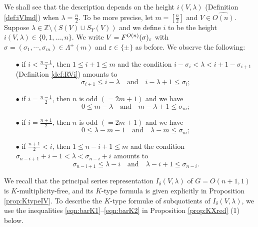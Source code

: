 We shall see that the description 
 depends on the height $i(V,\lambda)$ 
 (Definition \ref{def:iVlmd})
 when $\lambda = \frac n 2$.  
To be more precise,
 let $m=[\frac n 2]$ and $V \in \widehat{O(n)}$.  
Suppose $\lambda \in {\mathbb{Z}} \setminus(S(V) \cup S_Y(V))$
 and we define $i$ to be the height
 $i(V,\lambda) \in \{0,1,\ldots,n\}$.  
We write $V=F^{{O(n)}}({\sigma})_{\varepsilon}$
 with $\sigma=(\sigma_1, \cdots, \sigma_m)\in \Lambda^+(m)$
 and $\varepsilon \in \{\pm\}$ as before.  
We observe the following:
\begin{enumerate}
\item[$\bullet$]
if $i< \frac{n-1}{2}$, 
 then $1 \le i+1 \le m$
 and the condition $i-\sigma_i < \lambda< i+1 -\sigma_{i+1}$
 (Definition \ref{def:RVi})
 amounts to 
\begin{equation}
\label{eqn:barK1}
 \sigma_{i+1} \le i-\lambda
\quad\text{and}\quad 
 i-\lambda+1 \le \sigma_i;
\end{equation}
\item[$\bullet$]
if $i=\frac{n-1}{2}$, 
 then $n$ is odd $(=2m+1)$ 
 and we have
\begin{equation}
\label{eqn:barK3}
0 \le m-\lambda
\quad\text{and}\quad
m-\lambda+1 \le \sigma_m;
\end{equation}

\item[$\bullet$]
if $i=\frac{n+1}{2}$, 
 then $n$ is odd $(=2m+1)$ 
 and we have
\begin{equation}
\label{eqn:barK4}
0 \le \lambda-m-1
\quad\text{and}\quad
\lambda-m \le \sigma_m; 
\end{equation}
\item[$\bullet$]
if $\frac{n+1}2 < i$, 
 then $ 1 \le n-i+1 \le m$
 and the condition $\sigma_{n-i+1}+ i-1 < \lambda< \sigma_{n-i} +i$
 amounts to  
\begin{equation}
\label{eqn:barK2}
\sigma_{n-i+1} \le \lambda-i
\quad\text{and}\quad 
\lambda-i+1 \le \sigma_{n-i}.  
\end{equation}
\end{enumerate}

We recall that the principal series representation
$I_{\delta}(V,\lambda)$
 of $G=O(n+1,1)$
 is $K$-multiplicity-free,
 and its $K$-type formula 
 is given explicitly in Proposition \ref{prop:KtypeIV}.  
To describe the $K$-type formul{\ae}
 of subquotients of $I_{\delta}(V,\lambda)$, 
 we use the inequalities
 \eqref{eqn:barK1}--\eqref{eqn:barK2}
 in Proposition \ref{prop:KXred} (1) below.  

